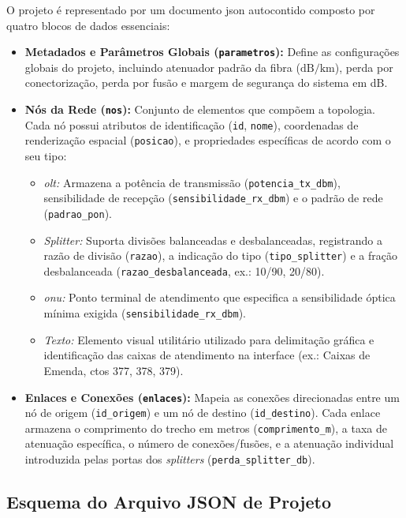 O projeto é representado por um documento \gls{json} autocontido composto por quatro blocos de dados essenciais:

\begin{itemize}
    \item \textbf{Metadados e Parâmetros Globais (\texttt{parametros}):} Define as configurações globais do projeto, incluindo atenuador padrão da fibra ($\text{dB/km}$), perda por conectorização, perda por fusão e margem de segurança do sistema em dB.
    
    \item \textbf{Nós da Rede (\texttt{nos}):} Conjunto de elementos que compõem a topologia. Cada nó possui atributos de identificação (\texttt{id}, \texttt{nome}), coordenadas de renderização espacial (\texttt{posicao}), e propriedades específicas de acordo com o seu tipo:
    \begin{itemize}
        \item \textit{\gls{olt}:} Armazena a potência de transmissão (\texttt{potencia\_tx\_dbm}), sensibilidade de recepção (\texttt{sensibilidade\_rx\_dbm}) e o padrão de rede (\texttt{padrao\_pon}).
        \item \textit{Splitter:} Suporta divisões balanceadas e desbalanceadas, registrando a razão de divisão (\texttt{razao}), a indicação do tipo (\texttt{tipo\_splitter}) e a fração desbalanceada (\texttt{razao\_desbalanceada}, ex.: 10/90, 20/80).
        \item \textit{\gls{onu}:} Ponto terminal de atendimento que especifica a sensibilidade óptica mínima exigida (\texttt{sensibilidade\_rx\_dbm}).
        \item \textit{Texto:} Elemento visual utilitário utilizado para delimitação gráfica e identificação das caixas de atendimento na interface (ex.: Caixas de Emenda, \glspl{cto} 377, 378, 379).
    \end{itemize}
    
    \item \textbf{Enlaces e Conexões (\texttt{enlaces}):} Mapeia as conexões direcionadas entre um nó de origem (\texttt{id\_origem}) e um nó de destino (\texttt{id\_destino}). Cada enlace armazena o comprimento do trecho em metros (\texttt{comprimento\_m}), a taxa de atenuação específica, o número de conexões/fusões, e a atenuação individual introduzida pelas portas dos \textit{splitters} (\texttt{perda\_splitter\_db}).
\end{itemize}

\subsection{Esquema do Arquivo JSON de Projeto}


